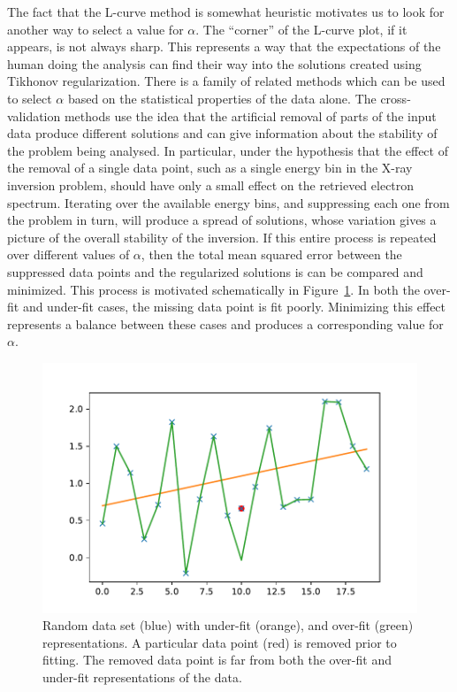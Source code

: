 The fact that the L-curve method is somewhat heuristic motivates us to look for another way to select a value for $\alpha$. The ``corner'' of the L-curve plot, if it appears, is not always sharp. This represents a way that the expectations of the human doing the analysis can find their way into the solutions created using Tikhonov regularization. There is a family of related methods which can be used to select $\alpha$ based on the statistical properties of the data alone. The cross-validation methods use the idea that the artificial removal of parts of the input data produce different solutions and can give information about the stability of the problem being analysed. In particular, under the hypothesis that the effect of the removal of a single data point, such as a single energy bin in the X-ray inversion problem, should have only a small effect on the retrieved electron spectrum. Iterating over the available energy bins, and suppressing each one from the problem in turn, will produce a spread of solutions, whose variation gives a picture of the overall stability of the inversion. If this entire process is repeated over different values of $\alpha$, then the total mean squared error between the suppressed data points and the regularized solutions is can be compared and minimized. This process is motivated schematically in Figure~\ref{cross_validation_motivation}. In both the over-fit and under-fit cases, the missing data point is fit poorly. Minimizing this effect represents a balance between these cases and produces a corresponding value for $\alpha$. 

\begin{figure}[p]
    \centering
    \includegraphics[width=1.0\textwidth]{figures/fig_10.pdf}
    \caption{Random data set (blue) with under-fit (orange), and over-fit (green) representations. A particular data point (red) is removed prior to fitting. The removed data point is far from both the over-fit and under-fit representations of the data. }
    \label{cross_validation_motivation}
\end{figure}

